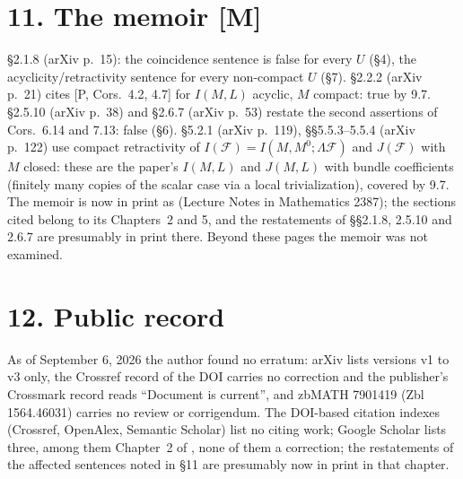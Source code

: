 \documentclass[11pt]{article}
\begin{document}
\section*{11. The memoir [M]}
\S2.1.8 (arXiv p.~15): the coincidence sentence is false for every $U$ (\S4), the acyclicity/retractivity sentence for every non-compact $U$ (\S7). \S2.2.2 (arXiv p.~21) cites [P, Cors.~4.2, 4.7] for $I(M,L)$ acyclic, $M$ compact: true by 9.7. \S2.5.10 (arXiv p.~38) and \S2.6.7 (arXiv p.~53) restate the second assertions of Cors.~6.14 and 7.13: false (\S6). \S5.2.1 (arXiv p.~119), \S\S5.5.3--5.5.4 (arXiv p.~122) use compact retractivity of $I(\mathcal F)=I(M,M^0;\Lambda\mathcal F)$ and $J(\mathcal F)$ with $M$ closed: these are the paper's $I(M,L)$ and $J(M,L)$ with bundle coefficients (finitely many copies of the scalar case via a local trivialization), covered by 9.7. The memoir is now in print as \cite{ALKL24m} (Lecture Notes in Mathematics 2387); the sections cited belong to its Chapters~2 and 5, and the restatements of \S\S2.1.8, 2.5.10 and 2.6.7 are presumably in print there. Beyond these pages the memoir was not examined.

\section*{12. Public record}
As of September 6, 2026 the author found no erratum: arXiv lists versions v1 to v3 only, the Crossref record of the DOI carries no correction and the publisher's Crossmark record reads ``Document is current'', and zbMATH 7901419 (Zbl 1564.46031) carries no review or corrigendum. The DOI-based citation indexes (Crossref, OpenAlex, Semantic Scholar) list no citing work; Google Scholar lists three, among them Chapter~2 of \cite{ALKL24m}, none of them a correction; the restatements of the affected sentences noted in \S11 are presumably now in print in that chapter.
\end{document}
